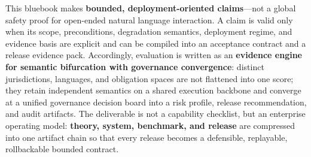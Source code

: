 \documentclass[11pt,a4paper]{report}
\begin{document}
\begin{bluebookabstract}
This bluebook makes \textbf{bounded, deployment-oriented claims}—not a global safety proof for open-ended natural language interaction. A claim is valid only when its scope, preconditions, degradation semantics, deployment regime, and evidence basis are explicit and can be compiled into an acceptance contract and a release evidence pack. Accordingly, evaluation is written as an \textbf{evidence engine for semantic bifurcation with governance convergence}: distinct jurisdictions, languages, and obligation spaces are not flattened into one score; they retain independent semantics on a shared execution backbone and converge at a unified governance decision board into a risk profile, release recommendation, and audit artifacts. The deliverable is not a capability checklist, but an enterprise operating model: \textbf{theory, system, benchmark, and release} are compressed into one artifact chain so that every release becomes a defensible, replayable, rollbackable bounded contract.
\end{bluebookabstract}
\end{document}
